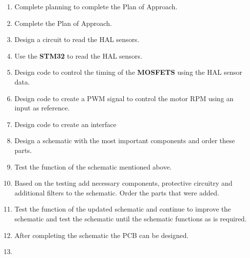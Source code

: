 \begin{enumerate}
    \item Complete planning to complete the Plan of Approach.
    \item Complete the Plan of Approach.
    \item Design a circuit to read the HAL sensors.
    \item Use the \textbf{STM32} to read the HAL sensors.
    \item Design code to control the timing of the \textbf{MOSFETS} using the HAL sensor data.
    \item Design code to create a PWM signal to control the motor RPM using an input as reference.
    \item Design code to create an interface
    \item Design a schematic with the most important components and order these parts.
    \item Test the function of the schematic mentioned above.
    \item Based on the testing add necessary components, protective circuitry and additional filters to the schematic. Order the parts that were added.
    \item Test the function of the updated schematic and continue to improve the schematic and test the schematic until the schematic functions as is required.
    \item After completing the schematic the PCB can be designed.
    \item 
\end{enumerate}